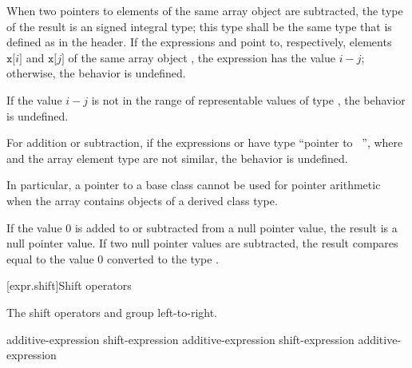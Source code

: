 \pnum
{}%
%
%
%
%
When two pointers to elements of the same array object are subtracted,
the type of the result is an  signed
integral type; this type shall be the same type that is defined as
 in the 
header.
If the expressions  and 
point to, respectively,
elements
$\mathtt{x[}i\mathtt{]}$
and
$\mathtt{x[}j\mathtt{]}$
of the same array object ,
the expression  has the value $i - j$;
otherwise, the behavior is undefined.
\begin{note}
If the value $i - j$
is not in the range of representable values
of type ,
the behavior is undefined.
\end{note}

\pnum
For addition or subtraction, if the expressions  or  have
type ``pointer to \cv{}~'', where  and the array element type
are not similar, the behavior is undefined.
\begin{note} In particular, a pointer to a base class cannot be used for
pointer arithmetic when the array contains objects of a derived class type.
\end{note}

\pnum
If the value 0 is added to or subtracted from a null pointer value,
the result is a null pointer value.
If two null pointer values are subtracted,
the result compares equal to the value 0
converted to the type .

[expr.shift]{Shift operators}

\pnum
{}%
%
%
%
%
%
The shift operators \tcode{<<} and \tcode{>>} group left-to-right.

%
%
%
%
%
\begin{bnf}
\br
    additive-expression\br
    shift-expression \terminal{<<} additive-expression\br
    shift-expression \terminal{>>} additive-expression
\end{bnf}

